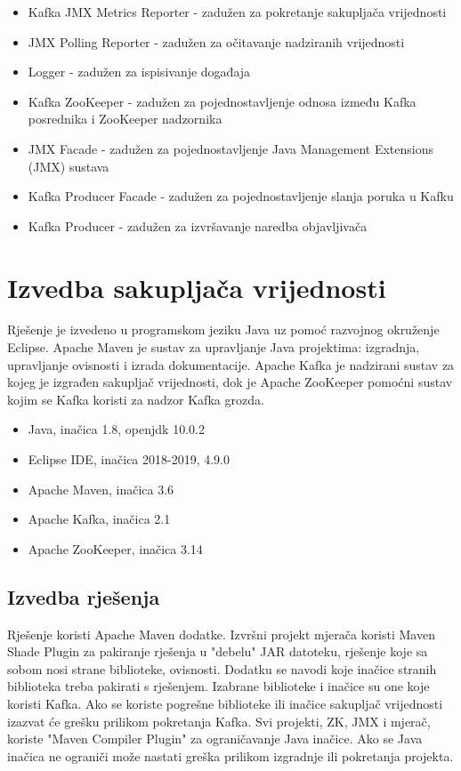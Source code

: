 \documentclass[utf8, diplomski, lmodern, numeric]{fer}
\begin{document}
\begin{itemize}
    \item Kafka JMX Metrics Reporter - zadužen za pokretanje sakupljača vrijednosti
    \item JMX Polling Reporter - zadužen za očitavanje nadziranih vrijednosti
    \item Logger - zadužen za ispisivanje događaja
    \item Kafka ZooKeeper - zadužen za pojednostavljenje odnosa između Kafka posrednika i ZooKeeper nadzornika
    \item JMX Facade - zadužen za pojednostavljenje Java Management Extensions (JMX) sustava
    \item Kafka Producer Facade - zadužen za pojednostavljenje slanja poruka u Kafku
    \item Kafka Producer - zadužen za izvršavanje naredba objavljivača
\end{itemize}



\chapter{Izvedba sakupljača vrijednosti}

Rješenje je izvedeno u programskom jeziku Java uz pomoć razvojnog okruženje Eclipse. Apache Maven je sustav za upravljanje Java projektima: izgradnja, upravljanje ovisnosti i izrada dokumentacije. Apache Kafka je nadzirani sustav za kojeg je izgrađen sakupljač vrijednosti, dok je Apache ZooKeeper pomoćni sustav kojim se Kafka koristi za nadzor Kafka grozda.

\begin{itemize}
    \item Java, inačica 1.8, openjdk 10.0.2
    \item Eclipse IDE, inačica 2018-2019, 4.9.0
    \item Apache Maven, inačica 3.6
    \item Apache Kafka, inačica 2.1
    \item Apache ZooKeeper, inačica 3.14
\end{itemize}


\section{Izvedba rješenja}

Rješenje koristi Apache Maven dodatke. Izvršni projekt mjerača koristi Maven Shade Plugin za pakiranje rješenja u "debelu" JAR datoteku, rješenje koje sa sobom nosi strane biblioteke, ovisnosti. Dodatku se navodi koje inačice stranih biblioteka treba pakirati s rješenjem. Izabrane biblioteke i inačice su one koje koristi Kafka. Ako se koriste pogrešne biblioteke ili inačice sakupljač vrijednosti izazvat će grešku prilikom pokretanja Kafka. Svi projekti, ZK, JMX i mjerač, koriste "Maven Compiler Plugin" za ograničavanje Java inačice. Ako se Java inačica ne ograniči može nastati greška prilikom izgradnje ili pokretanja projekta.
\end{document}
